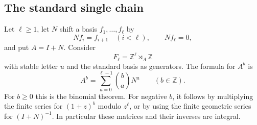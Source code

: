 \documentclass[11pt]{article}
\numberwithin{equation}{section}
\theoremstyle{definition}
\theoremstyle{remark}
\newcommand{\Z}{\mathbb Z}
\begin{document}
\subsection{The standard single chain}
Let $\ell\ge1$, let $N$ shift a basis $f_1,\ldots,f_\ell$ by
\[
Nf_i=f_{i+1}\quad(i<\ell),\qquad Nf_\ell=0,
\]
and put $A=I+N$. Consider
\[
F_\ell=\Z^\ell\rtimes_A\Z
\]
with stable letter $u$ and the standard basis as generators. The formula for $A^b$ is
\begin{equation}\label{eq:binomialA}
A^b=\sum_{a=0}^{\ell-1}\binom ba N^a\qquad(b\in\Z).
\end{equation}
For $b\ge0$ this is the binomial theorem. For negative $b$, it follows by multiplying the finite series for $(1+z)^b$ modulo $z^\ell$, or by using the finite geometric series for $(I+N)^{-1}$. In particular these matrices and their inverses are integral.
\end{document}
